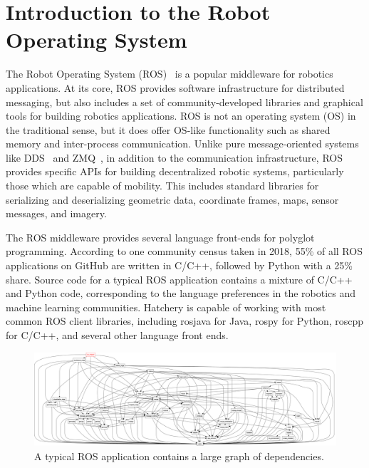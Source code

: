 \documentclass[12pt,initial,twoside,maitrise]{dms}
\numberwithin{equation}{section}
\numberwithin{table}{chapter}
\numberwithin{figure}{chapter}
\begin{document}
\section{Introduction to the Robot Operating System}

The Robot Operating System (ROS)~\citep{quigley2009ros} is a popular middleware for robotics applications. At its core, ROS provides software infrastructure for distributed messaging, but also includes a set of community-developed libraries and graphical tools for building robotics applications. ROS is not an operating system (OS) in the traditional sense, but it does offer OS-like functionality such as shared memory and inter-process communication. Unlike pure message-oriented systems like DDS~\citep{pardo2003omg} and ZMQ~\citep{hintjens2013zeromq}, in addition to the communication infrastructure, ROS provides specific APIs for building decentralized robotic systems, particularly those which are capable of mobility. This includes standard libraries for serializing and deserializing geometric data, coordinate frames, maps, sensor messages, and imagery.

The ROS middleware provides several language front-ends for polyglot programming. According to one community census taken in 2018, 55\% of all ROS applications on GitHub are written in C/C++, followed by Python with a 25\%~\citep{Areserio54:online} share. Source code for a typical ROS application contains a mixture of C/C++ and Python code, corresponding to the language preferences in the robotics and machine learning communities. Hatchery is capable of working with most common ROS client libraries, including rosjava for Java, rospy for Python, roscpp for C/C++, and several other language front ends.

\begin{figure}
\centering
\includegraphics[width=\textwidth]{rqt_dep_graph.png}
\caption{A typical ROS application contains a large graph of dependencies.}
\end{figure}
\end{document}
